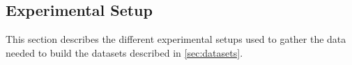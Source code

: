 \subsection{Experimental Setup} \label{sec:experimental-setup}

This section describes the different experimental setups used to gather the
data needed to build the datasets described in \cref{sec:datasets}.



